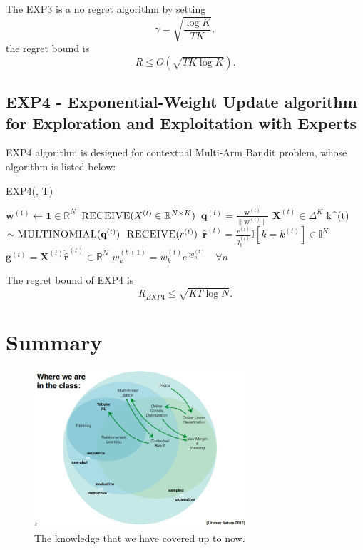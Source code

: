 \documentclass[11pt]{article}
\begin{document}
The EXP3 is a no regret algorithm by setting
$$\gamma = \sqrt{\frac{\log K}{TK}},$$
the regret bound is
$$R \le O(\sqrt{TK \log K}).$$

\subsection{EXP4 - Exponential-Weight Update algorithm for Exploration and Exploitation with  Experts}
EXP4 algorithm is designed for contextual Multi-Arm Bandit problem, whose algorithm is listed below:
\begin{algorithm}[H]
\caption{EXP4(\gamma \in [0, 1], T)}
\label{algo:exp4}
\begin{algorithmic}[1]
\STATE $\textbf{w}^{(1)} \leftarrow \textbf{1} \in \mathbb{R}^N$ \quad {}
\STATE $\textsc{RECEIVE}( X^{(t)}\in \mathbb{R}^{N \times K})$ \quad {}
\STATE $\textbf{q}^{(t)} = \frac{\textbf{w}^{(t)}}{\|\textbf{w}^{(t)}\|}$ \dot $ \textbf{X}^{(t)} \in \Delta^K$ \quad {}
\STATE k^{(t)} $\sim  \textsc{MULTINOMIAL}(\textbf{q}^{(t)})$ \quad {}
\STATE $\textsc{RECEIVE}(r^{(t)})$ \quad {}
\STATE $\hat{\textbf{r}}^{(t)} = \frac{r^{(t)}}{q_k^{(t)}}\mathbb{I}[k = k^{(t)}] \in \mathbb{I}^K$ \quad {}
\STATE $\textbf{g}^{(t)} = \textbf{X}^{(t)} \dot \hat{\textbf{r}}^{(t)} \in \mathbb{R}^N$ \quad {}
\STATE $w_k^{(t+1)} = w_k^{(t)}e^{\gamma g_n^{(t)}} \quad \forall n$ 
\ENDFOR
\end{algorithmic}
\end{algorithm}
The regret bound of EXP4 is 
$$R_{EXP4} \le \sqrt{KT \log N}.$$

\section{Summary}
\begin{figure}[H]
\centering
    \includegraphics[width=0.7\textwidth]{1.png}
    \caption{The knowledge that we have covered up to now.}
	\label{fig:3.2-original}
\end{figure}
\end{document}
